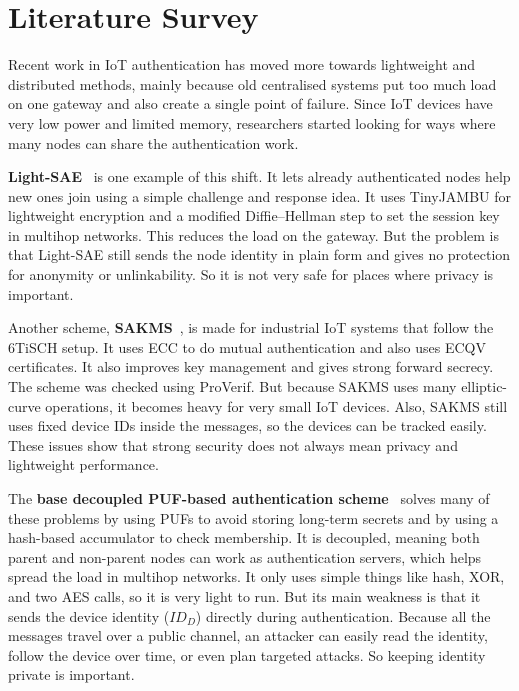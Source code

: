 \documentclass[12pt,a4paper]{report}
\begin{document}
\chapter{Literature Survey}

Recent work in IoT authentication has moved more towards lightweight and distributed
methods, mainly because old centralised systems put too much load on one gateway and
also create a single point of failure.
Since IoT devices have very low power and limited memory, researchers started looking
for ways where many nodes can share the authentication work.

\textbf{Light-SAE}~\cite{rosa2023lightsae} is one example of this shift.
It lets already authenticated nodes help new ones join using a simple challenge and
response idea.
It uses TinyJAMBU for lightweight encryption and a modified Diffie--Hellman step to
set the session key in multihop networks.
This reduces the load on the gateway.
But the problem is that Light-SAE still sends the node identity in plain form and
gives no protection for anonymity or unlinkability.
So it is not very safe for places where privacy is important.

Another scheme, \textbf{SAKMS}~\cite{yang2024sakms}, is made for industrial IoT
systems that follow the 6TiSCH setup.
It uses ECC to do mutual authentication and also uses ECQV certificates.
It also improves key management and gives strong forward secrecy.
The scheme was checked using ProVerif.
But because SAKMS uses many elliptic-curve operations, it becomes heavy for very
small IoT devices.
Also, SAKMS still uses fixed device IDs inside the messages, so the devices can be
tracked easily.
These issues show that strong security does not always mean privacy and lightweight
performance.

The \textbf{base decoupled PUF-based authentication scheme}~\cite{das2026comsnets}
solves many of these problems by using PUFs to avoid storing long-term secrets and
by using a hash-based accumulator to check membership.
It is decoupled, meaning both parent and non-parent nodes can work as authentication
servers, which helps spread the load in multihop networks.
It only uses simple things like hash, XOR, and two AES calls, so it is very light
to run.
But its main weakness is that it sends the device identity ($ID_D$) directly during
authentication.
Because all the messages travel over a public channel, an attacker can easily read
the identity, follow the device over time, or even plan targeted attacks.
So keeping identity private is important.
\end{document}
